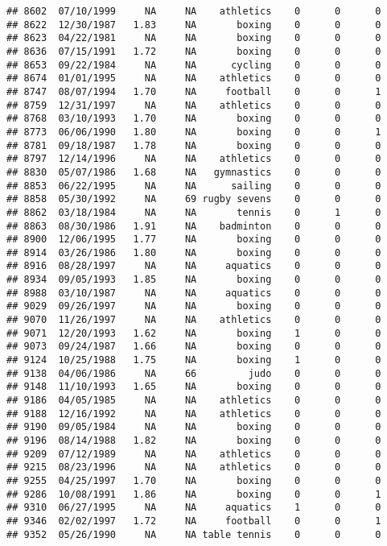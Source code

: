 \documentclass[]{article}
\begin{document}
\begin{verbatim}
## 8602  07/10/1999     NA     NA    athletics    0      0      0
## 8622  12/30/1987   1.83     NA       boxing    0      0      0
## 8623  04/22/1981     NA     NA       boxing    0      0      0
## 8636  07/15/1991   1.72     NA       boxing    0      0      0
## 8653  09/22/1984     NA     NA      cycling    0      0      0
## 8674  01/01/1995     NA     NA    athletics    0      0      0
## 8747  08/07/1994   1.70     NA     football    0      0      1
## 8759  12/31/1997     NA     NA    athletics    0      0      0
## 8768  03/10/1993   1.70     NA       boxing    0      0      0
## 8773  06/06/1990   1.80     NA       boxing    0      0      1
## 8781  09/18/1987   1.78     NA       boxing    0      0      0
## 8797  12/14/1996     NA     NA    athletics    0      0      0
## 8830  05/07/1986   1.68     NA   gymnastics    0      0      0
## 8853  06/22/1995     NA     NA      sailing    0      0      0
## 8858  05/30/1992     NA     69 rugby sevens    0      0      0
## 8862  03/18/1984     NA     NA       tennis    0      1      0
## 8863  08/30/1986   1.91     NA    badminton    0      0      0
## 8900  12/06/1995   1.77     NA       boxing    0      0      0
## 8914  03/26/1986   1.80     NA       boxing    0      0      0
## 8916  08/28/1997     NA     NA     aquatics    0      0      0
## 8934  09/05/1993   1.85     NA       boxing    0      0      0
## 8988  03/10/1987     NA     NA     aquatics    0      0      0
## 9029  09/26/1997     NA     NA       boxing    0      0      0
## 9070  11/26/1997     NA     NA    athletics    0      0      0
## 9071  12/20/1993   1.62     NA       boxing    1      0      0
## 9073  09/24/1987   1.66     NA       boxing    0      0      0
## 9124  10/25/1988   1.75     NA       boxing    1      0      0
## 9138  04/06/1986     NA     66         judo    0      0      0
## 9148  11/10/1993   1.65     NA       boxing    0      0      0
## 9186  04/05/1985     NA     NA    athletics    0      0      0
## 9188  12/16/1992     NA     NA    athletics    0      0      0
## 9190  09/05/1984     NA     NA       boxing    0      0      0
## 9196  08/14/1988   1.82     NA       boxing    0      0      0
## 9209  07/12/1989     NA     NA    athletics    0      0      0
## 9215  08/23/1996     NA     NA    athletics    0      0      0
## 9255  04/25/1997   1.70     NA       boxing    0      0      0
## 9286  10/08/1991   1.86     NA       boxing    0      0      1
## 9310  06/27/1995     NA     NA     aquatics    1      0      0
## 9346  02/02/1997   1.72     NA     football    0      0      1
## 9352  05/26/1990     NA     NA table tennis    0      0      0

\end{verbatim}
\end{document}
